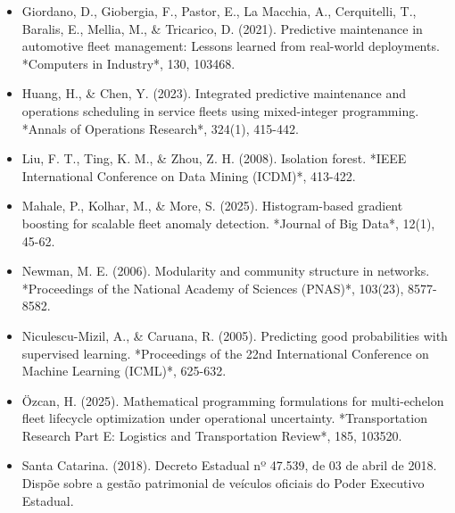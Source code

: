 \documentclass[10pt,a4paper,journal]{article}
\begin{document}
\begin{itemize}
\item Giordano, D., Giobergia, F., Pastor, E., La Macchia, A., Cerquitelli, T., Baralis, E., Mellia, M., \& Tricarico, D. (2021). Predictive maintenance in automotive fleet management: Lessons learned from real-world deployments. *Computers in Industry*, 130, 103468.
\end{itemize}
\begin{itemize}
\item Huang, H., \& Chen, Y. (2023). Integrated predictive maintenance and operations scheduling in service fleets using mixed-integer programming. *Annals of Operations Research*, 324(1), 415-442.
\end{itemize}
\begin{itemize}
\item Liu, F. T., Ting, K. M., \& Zhou, Z. H. (2008). Isolation forest. *IEEE International Conference on Data Mining (ICDM)*, 413-422.
\end{itemize}
\begin{itemize}
\item Mahale, P., Kolhar, M., \& More, S. (2025). Histogram-based gradient boosting for scalable fleet anomaly detection. *Journal of Big Data*, 12(1), 45-62.
\end{itemize}
\begin{itemize}
\item Newman, M. E. (2006). Modularity and community structure in networks. *Proceedings of the National Academy of Sciences (PNAS)*, 103(23), 8577-8582.
\end{itemize}
\begin{itemize}
\item Niculescu-Mizil, A., \& Caruana, R. (2005). Predicting good probabilities with supervised learning. *Proceedings of the 22nd International Conference on Machine Learning (ICML)*, 625-632.
\end{itemize}
\begin{itemize}
\item Özcan, H. (2025). Mathematical programming formulations for multi-echelon fleet lifecycle optimization under operational uncertainty. *Transportation Research Part E: Logistics and Transportation Review*, 185, 103520.
\end{itemize}
\begin{itemize}
\item Santa Catarina. (2018). Decreto Estadual nº 47.539, de 03 de abril de 2018. Dispõe sobre a gestão patrimonial de veículos oficiais do Poder Executivo Estadual.
\end{itemize}
\end{document}

